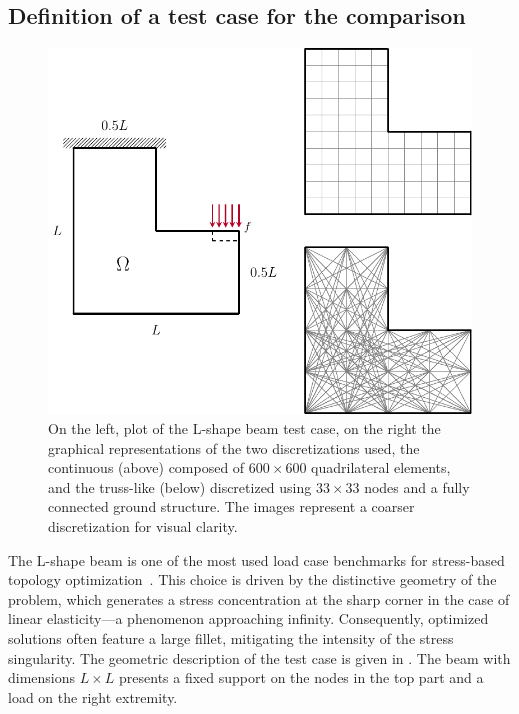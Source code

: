 \subsection{Definition of a test case for the comparison}
\begin{figure}
    \centering
    \includegraphics[scale=0.75]{figures/03_comparison_TO_TTO/06_L_bc/L_bc.pdf}
    \caption{On the left, plot of the L-shape beam test case, on the right the graphical representations of the two discretizations used, the continuous (above) composed of $600\times600$ quadrilateral elements, and the truss-like (below) discretized using $33\times 33$ nodes and a fully connected ground structure. The images represent a coarser discretization for visual clarity.}
    \label{fig:03_L_bc}
\end{figure}
The L-shape beam is one of the most used load case benchmarks for stress-based topology optimization~. This choice is driven by the distinctive geometry of the problem, which generates a stress concentration at the sharp corner in the case of linear elasticity—a phenomenon approaching infinity. Consequently, optimized solutions often feature a large fillet, mitigating the intensity of the stress singularity. The geometric description of the test case is given in . The beam with dimensions $L\times L$ presents a fixed support on the nodes in the top part and a load on the right extremity.

